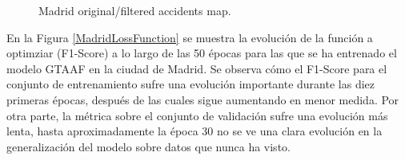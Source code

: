 \documentclass{uathesis-es}
\begin{document}
\begin{figure}[H]
    \centering
    \caption{Madrid original/filtered accidents map.}
    \label{MadridAccidentsMap}
\end{figure}

En la Figura \ref{MadridLossFunction} se muestra la evolución de la función a optimziar (F1-Score) a lo largo de las 50 épocas para las que se ha entrenado el modelo GTAAF en la ciudad de Madrid. Se observa cómo el F1-Score para el conjunto de entrenamiento sufre una evolución importante durante las diez primeras épocas, después de las cuales sigue aumentando en menor medida. Por otra parte, la métrica sobre el conjunto de validación sufre una evolución más lenta, hasta aproximadamente la época 30 no se ve una clara evolución en la generalización del modelo sobre datos que nunca ha visto.
\end{document}
